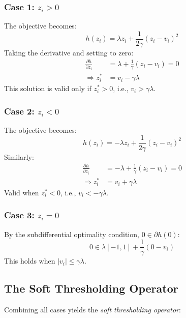 \documentclass[12pt]{article}
\theoremstyle{definition}
\begin{document}
\subsubsection{Case 1: $z_i > 0$}
The objective becomes:
\begin{equation}
    h(z_i) = \lambda z_i + \frac{1}{2\gamma}(z_i - v_i)^2
\end{equation}
Taking the derivative and setting to zero:
\begin{align}
    \frac{\partial h}{\partial z_i} & = \lambda + \frac{1}{\gamma}(z_i - v_i) = 0 \\
    \Rightarrow z_i^*               & = v_i - \gamma\lambda
\end{align}
This solution is valid only if $z_i^* > 0$, i.e., $v_i > \gamma\lambda$.

\subsubsection{Case 2: $z_i < 0$}
The objective becomes:
\begin{equation}
    h(z_i) = -\lambda z_i + \frac{1}{2\gamma}(z_i - v_i)^2
\end{equation}
Similarly:
\begin{align}
    \frac{\partial h}{\partial z_i} & = -\lambda + \frac{1}{\gamma}(z_i - v_i) = 0 \\
    \Rightarrow z_i^*               & = v_i + \gamma\lambda
\end{align}
Valid when $z_i^* < 0$, i.e., $v_i < -\gamma\lambda$.

\subsubsection{Case 3: $z_i = 0$}
By the subdifferential optimality condition, $0 \in \partial h(0)$:
\begin{equation}
    0 \in \lambda[-1,1] + \frac{1}{\gamma}(0 - v_i)
\end{equation}
This holds when $|v_i| \leq \gamma\lambda$.

\subsection{The Soft Thresholding Operator}

Combining all cases yields the \textit{soft thresholding operator}:
\end{document}
